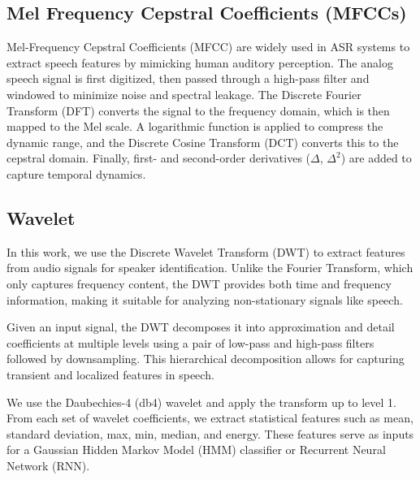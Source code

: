 \documentclass[conference]{IEEEtran}
\begin{document}
\subsection{Mel Frequency Cepstral Coefficients (MFCCs)}
Mel-Frequency Cepstral Coefficients (MFCC) are widely used in ASR systems to extract speech features by
mimicking human auditory perception. The analog speech signal is first digitized, then passed through a
high-pass filter and windowed to minimize noise and spectral leakage. The Discrete Fourier Transform (DFT)
converts the signal to the frequency domain, which is then mapped to the Mel scale. A logarithmic function
is applied to compress the dynamic range, and the Discrete Cosine Transform (DCT) converts this to the cepstral
domain. Finally, first- and second-order derivatives ($\Delta$, $\Delta^2$) are added to capture temporal dynamics. \cite{davis1980comparison}















\subsection{Wavelet}

In this work, we use the Discrete Wavelet Transform (DWT) to extract features
from audio signals for speaker identification. Unlike the Fourier Transform,
which only captures frequency content, the DWT provides both time and frequency information, making it suitable for analyzing non-stationary signals like speech.

Given an input signal, the DWT decomposes it into approximation and detail
coefficients at multiple levels using a pair of low-pass and high-pass filters followed by downsampling. This hierarchical decomposition allows for capturing transient and localized features in speech.

We use the Daubechies-4 (db4) wavelet and apply the transform up to level 1.
From each set of wavelet coefficients, we extract statistical features such as mean, standard deviation, max, min, median, and energy. These features serve as inputs for a Gaussian Hidden Markov Model (HMM) classifier or Recurrent Neural Network (RNN). \cite{tufekci2000dwt}
\end{document}
